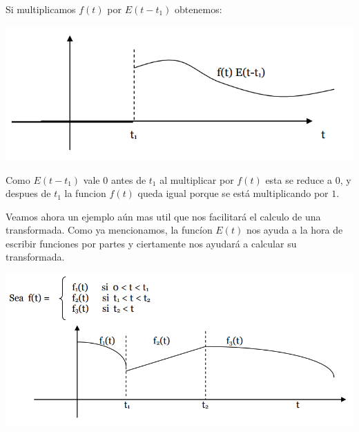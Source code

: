 \documentclass[]{article}
\begin{document}
Si multiplicamos $f(t)$ por $E(t-t_{1})$ obtenemos: 

\includegraphics{../../../Imagenes/Superior/TransformadaDeLaplace/Laplace04.PNG}

Como $E(t-t_{1})$ vale $0$ antes de $t_{1}$ al multiplicar por $f(t)$ esta se reduce a $0$, y despues de $t_{1}$ la funcion $f(t)$ queda igual porque se está multiplicando por $1$.

Veamos ahora un ejemplo aún mas util que nos facilitará el calculo de una transformada. Como ya mencionamos, la funcíon $E(t)$ nos ayuda a la hora de escribir funciones por partes y ciertamente nos ayudará a calcular su transformada.

\includegraphics{../../../Imagenes/Superior/TransformadaDeLaplace/Laplace05.PNG}
\end{document}
